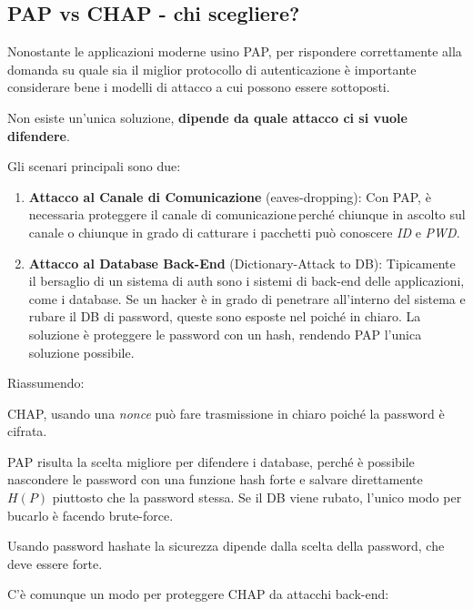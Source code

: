 \subsection{PAP vs CHAP - chi scegliere?}
Nonostante le applicazioni moderne usino PAP, per rispondere correttamente alla domanda su quale sia il miglior protocollo di autenticazione è importante considerare bene i modelli di attacco a cui possono essere sottoposti. 
\begin{theorem}
Non esiste un'unica soluzione, \textbf{dipende da quale attacco ci si vuole difendere}.
\end{theorem}
Gli scenari principali sono due:
\begin{enumerate}
    \item \textbf{Attacco al Canale di Comunicazione} (eaves-dropping): Con PAP, è necessaria proteggere il canale di comunicazione\footnotemark \,perché chiunque in ascolto sul canale o chiunque in grado di catturare i pacchetti può conoscere \textit{ID} e \textit{PWD}.  
    \item \textbf{Attacco al Database Back-End} (Dictionary-Attack to DB): Tipicamente il bersaglio di un sistema di auth sono i sistemi di back-end delle applicazioni, come i database. Se un hacker è in grado di penetrare all'interno del sistema e rubare il DB di password, queste sono esposte nel poiché in chiaro. La soluzione è proteggere le password con un hash, rendendo PAP l'unica soluzione possibile.
\end{enumerate}
Riassumendo: 
\begin{proposition}
CHAP, usando una \textit{nonce} può fare trasmissione in chiaro poiché la password è cifrata.
\end{proposition}
\begin{proposition}
PAP risulta la scelta migliore per difendere i database, perché è possibile nascondere le password con una funzione hash forte e salvare direttamente $H(P)$ piuttosto che la password stessa. Se il DB viene rubato, l'unico modo per bucarlo è facendo brute-force.
\end{proposition}
\begin{remark}
Usando password hashate la sicurezza dipende dalla scelta della password, che deve essere forte. 
\end{remark}
C'è comunque un modo per proteggere CHAP da attacchi back-end:
